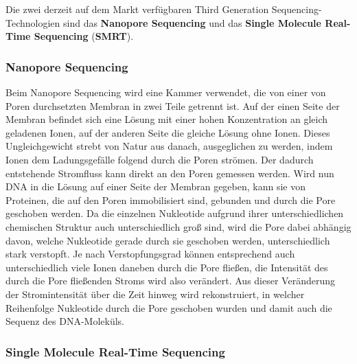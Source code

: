 Die zwei derzeit auf dem Markt verfügbaren Third Generation Sequencing-Technologien sind das \textbf{Nanopore Sequencing} und das \textbf{Single Molecule Real-Time Sequencing} (\textbf{SMRT}).

\subsubsection{Nanopore Sequencing}

Beim Nanopore Sequencing wird eine Kammer verwendet, die von einer von Poren durchsetzten Membran in zwei Teile getrennt ist. Auf der einen Seite der Membran befindet sich eine Lösung mit einer hohen Konzentration an gleich geladenen Ionen, auf der anderen Seite die gleiche Lösung ohne Ionen. Dieses Ungleichgewicht strebt von Natur aus danach, ausgeglichen zu werden, indem Ionen dem Ladungsgefälle folgend durch die Poren strömen. Der dadurch entstehende Stromfluss kann direkt an den Poren gemessen werden. Wird nun DNA in die Lösung auf einer Seite der Membran gegeben, kann sie von Proteinen, die auf den Poren immobilisiert sind, gebunden und durch die Pore geschoben werden. Da die einzelnen Nukleotide aufgrund ihrer unterschiedlichen chemischen Struktur auch unterschiedlich groß sind, wird die Pore dabei abhängig davon, welche Nukleotide gerade durch sie geschoben werden, unterschiedlich stark verstopft. Je nach Verstopfungsgrad können entsprechend auch unterschiedlich viele Ionen daneben durch die Pore fließen, die Intensität des durch die Pore fließenden Stroms wird also verändert. Aus dieser Veränderung der Stromintensität über die Zeit hinweg wird rekonstruiert, in welcher Reihenfolge Nukleotide durch die Pore geschoben wurden und damit auch die Sequenz des DNA-Moleküls.

\subsubsection{Single Molecule Real-Time Sequencing}


